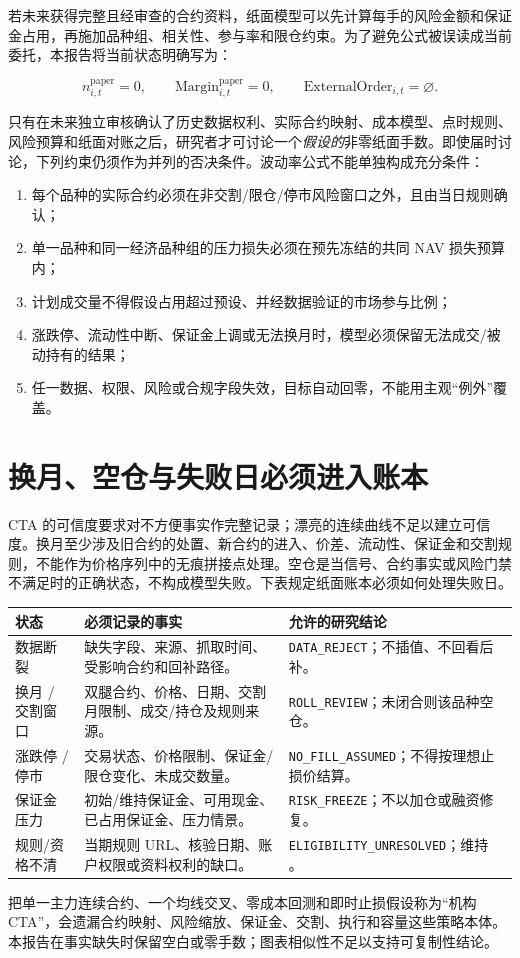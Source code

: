 若未来获得完整且经审查的合约资料，纸面模型可以先计算每手的风险金额和保证金占用，再施加品种组、相关性、参与率和限仓约束。为了避免公式被误读成当前委托，本报告将当前状态明确写为：

\[
n^{\mathrm{paper}}_{i,t}=0,\qquad
\mathrm{Margin}^{\mathrm{paper}}_{i,t}=0,\qquad
\mathrm{ExternalOrder}_{i,t}=\varnothing.
\]

只有在未来独立审核确认了历史数据权利、实际合约映射、成本模型、点时规则、风险预算和纸面对账之后，研究者才可讨论一个\emph{假设的}非零纸面手数。即使届时讨论，下列约束仍须作为并列的否决条件。波动率公式不能单独构成充分条件：

\begin{enumerate}
  \item 每个品种的实际合约必须在非交割/限仓/停市风险窗口之外，且由当日规则确认；
  \item 单一品种和同一经济品种组的压力损失必须在预先冻结的共同 NAV 损失预算内；
  \item 计划成交量不得假设占用超过预设、并经数据验证的市场参与比例；
  \item 涨跌停、流动性中断、保证金上调或无法换月时，模型必须保留无法成交/被动持有的结果；
  \item 任一数据、权限、风险或合规字段失效，目标自动回零，不能用主观“例外”覆盖。
\end{enumerate}

\section{换月、空仓与失败日必须进入账本}

CTA 的可信度要求对不方便事实作完整记录；漂亮的连续曲线不足以建立可信度。换月至少涉及旧合约的处置、新合约的进入、价差、流动性、保证金和交割规则，不能作为价格序列中的无痕拼接点处理。空仓是当信号、合约事实或风险门禁不满足时的正确状态，不构成模型失败。下表规定纸面账本必须如何处理失败日。

\begin{exhibitbox}
\small
\begin{tabularx}{\exhibitboxwidth}{L{3.1cm}X L{3.8cm}}
\toprule
\textbf{状态} & \textbf{必须记录的事实} & \textbf{允许的研究结论} \\
\midrule
数据断裂 & 缺失字段、来源、抓取时间、受影响合约和回补路径。 & \texttt{DATA\_REJECT}；不插值、不回看后补。 \\
换月 / 交割窗口 & 双腿合约、价格、日期、交割月限制、成交/持仓及规则来源。 & \texttt{ROLL\_REVIEW}；未闭合则该品种空仓。 \\
涨跌停 / 停市 & 交易状态、价格限制、保证金/限仓变化、未成交数量。 & \texttt{NO\_FILL\_ASSUMED}；不得按理想止损价结算。 \\
保证金压力 & 初始/维持保证金、可用现金、已占用保证金、压力情景。 & \texttt{RISK\_FREEZE}；不以加仓或融资修复。 \\
规则/资格不清 & 当期规则 URL、核验日期、账户权限或资料权利的缺口。 & {\scriptsize\texttt{ELIGIBILITY\_UNRESOLVED}}；维持 \qzero{}。 \\
\bottomrule
\end{tabularx}
\end{exhibitbox}

\begin{riskbox}
把单一主力连续合约、一个均线交叉、零成本回测和即时止损假设称为“机构 CTA”，会遗漏合约映射、风险缩放、保证金、交割、执行和容量这些策略本体。本报告在事实缺失时保留空白或零手数；图表相似性不足以支持可复制性结论。
\end{riskbox}
